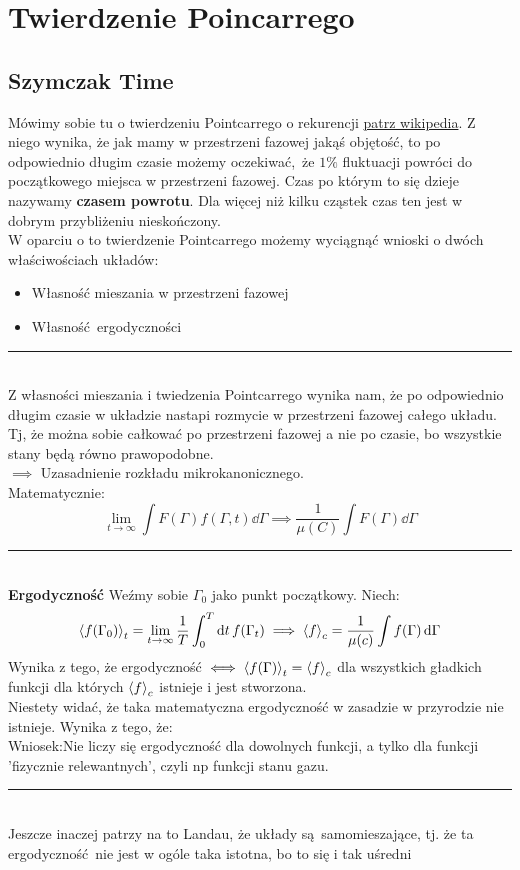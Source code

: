 \documentclass[12pt,a4paper]{report}
\newcommand{\link}[2]{{\color{cyan} \href{#1}{#2}}}
\renewcommand{\emph}{\textbf}
\newcommand{\linediv}{{\color{RubineRed} \rule{\linewidth}{0.5mm}}}
\newcommand{\wniosek}{{\color{orange} Wniosek:}}
\newenvironment{lecture}[1]{\par\medskip
   \noindent\chapter{#1} \rmfamily}{\medskip}
\begin{document}
\begin{lecture}{Twierdzenie Poincarrego}
\section{Szymczak Time}
Mówimy sobie tu o twierdzeniu Pointcarrego o rekurencji \link{https://en.wikipedia.org/wiki/Poincaré_recurrence_theorem}{patrz wikipedia}. Z niego wynika, że jak mamy w przestrzeni fazowej jakąś objętość, to po odpowiednio długim czasie możemy oczekiwać, że $1\%$ fluktuacji powróci do początkowego miejsca w przestrzeni fazowej. Czas po którym to się dzieje nazywamy \emph{czasem powrotu}. Dla więcej niż kilku cząstek czas ten jest w dobrym przybliżeniu nieskończony. \\
W oparciu o to twierdzenie Pointcarrego możemy wyciągnąć wnioski o dwóch właściwościach układów:
\begin{itemize}
    \item Własność mieszania w przestrzeni fazowej
    \item Własność ergodyczności
\end{itemize}
\linediv\\
Z własności mieszania i twiedzenia Pointcarrego wynika nam, że po odpowiednio długim czasie w układzie nastapi rozmycie w przestrzeni fazowej całego układu. Tj, że można sobie całkować po przestrzeni fazowej a nie po czasie, bo wszystkie stany będą równo prawopodobne. \\
$\implies$ Uzasadnienie rozkładu mikrokanonicznego.\\
Matematycznie:
\[
    \lim_{t\to\infty} \int F(\Gamma)f(\Gamma, t) \dd{\Gamma} \implies \frac{1}{\mu(C)} \int F(\Gamma) \dd{\Gamma}
\]
\linediv\\
\emph{Ergodyczność}
Weźmy sobie $\Gamma_0$ jako punkt początkowy. Niech:
\[
    \ev{f(\Gamma_0)}_t = \lim_{t\to\infty} \frac{1}{T} \int_0^T \dd{t} f(\Gamma_t) \implies \ev{f}_c = \frac{1}{\mu(c)}\int f(\Gamma) \dd{\Gamma}
\]
Wynika z tego, że ergodyczność $\iff \ev{f(\Gamma)}_t = \ev{f}_c$ dla wszystkich gładkich funkcji dla których $\ev{f}_c$ istnieje i jest stworzona.\\
Niestety widać, że taka matematyczna ergodyczność w zasadzie w przyrodzie nie istnieje. Wynika z tego, że:\\
\wniosek Nie liczy się ergodyczność dla dowolnych funkcji, a tylko dla funkcji 'fizycznie relewantnych', czyli np funkcji stanu gazu.\\
\linediv\\
Jeszcze inaczej patrzy na to Landau, że układy są samomieszające, tj. że ta ergodyczność nie jest w ogóle taka istotna, bo to się i tak uśredni


\end{lecture}
\end{document}
